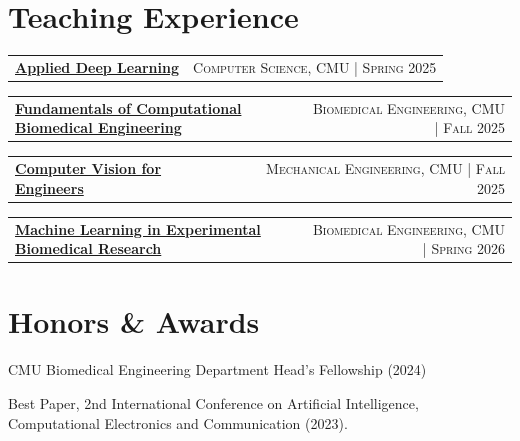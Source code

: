 \documentclass[letterpaper,10pt]{article}
\makeatletter
\newlength{\entrygap}
\newcommand{\cvProject}[2]{%
  \needspace{3\baselineskip}%
  \begin{tabularx}{\textwidth}{@{}X@{\hspace{0.5em}}r@{}}
    \textbf{#1} & {\small #2}
  \end{tabularx}\par\vspace{1pt}%
}
\newenvironment{cvitems}{%
  \begin{itemize}[leftmargin=0.17in,label=\textbullet,
    topsep=0pt,itemsep=2pt,parsep=0pt,partopsep=0pt]
  \normalsize
}{%
  \end{itemize}\vspace{\entrygap}%
}
\makeatother
\begin{document}
\section{Teaching Experience}

\cvProject{\href{https://tushar-nayak.github.io/assets/pdf/17644s25.pdf}{Applied Deep Learning \tiny \faExternalLink*}}{\textsc{Computer Science, CMU | Spring 2025}}

  \cvProject{\href{https://tushar-nayak.github.io/assets/pdf/42675F25.pdf}{Fundamentals of Computational Biomedical Engineering \tiny \faExternalLink*}}{\textsc{Biomedical Engineering, CMU | \hspace{6pt} Fall 2025}}

  \cvProject{\href{https://tushar-nayak.github.io/assets/pdf/24678f25.pdf}{Computer Vision for Engineers \tiny \faExternalLink*}}{\textsc{Mechanical Engineering, CMU | \hspace{6pt} Fall 2025}}

    \cvProject{\href{https://tushar-nayak.github.io/assets/pdf/42_698_S26.pdf}{Machine Learning in Experimental Biomedical Research \tiny \faExternalLink*}}{\textsc{Biomedical Engineering, CMU | Spring 2026}}


\section{Honors \& Awards}
{
CMU Biomedical Engineering Department Head's Fellowship (2024) \par
Best Paper, 2nd International Conference on Artificial Intelligence,
Computational Electronics and Communication (2023).\par}
\end{document}
